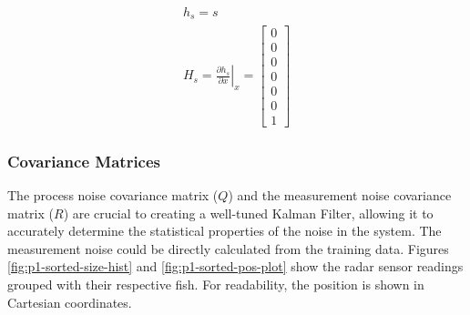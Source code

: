 \documentclass[12pt]{article}
\begin{document}
\begin{equation}
    \label{eqn:p1-size-model}
    \begin{gathered}
        h_{s} = s \\
        H_{s} = \left. \frac{\partial h_{s}}{\partial x} \right|_x =
        \begin{bmatrix}
            0 \\ 0 \\ 0 \\ 0 \\ 0 \\ 0 \\ 1
        \end{bmatrix}
    \end{gathered}
\end{equation}

\subsubsection{Covariance Matrices}\label{sec:p1-covariance-matrices}
The process noise covariance matrix ($Q$) and the measurement noise covariance matrix ($R$) are crucial to creating a well-tuned Kalman Filter, allowing it to accurately determine the statistical properties of the noise in the system. The measurement noise could be directly calculated from the training data. Figures \ref{fig:p1-sorted-size-hist} and \ref{fig:p1-sorted-pos-plot} show the radar sensor readings grouped with their respective fish. For readability, the position is shown in Cartesian coordinates.
\end{document}
